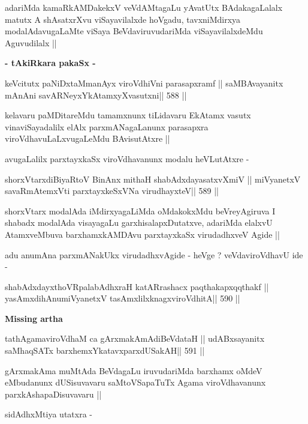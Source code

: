 \begin{artha}
adariMda kamaRkAMDakekxV veVdAMtagaLu yAvatUtx BAdakagaLalalx matutx A
shAsatxrXvu viSayavilalxde hoVgadu, tavxniMdirxya modalAdavugaLaMte
viSaya BeVdaviruvudariMda viSayavilalxdeMdu Aguvudilalx ||
\end{artha}

\medskip
\centerline{\textbf{- tAkiRkara pakaSx -}}

\begin{shl}
keVcitutx paNiDxtaMmanAyx viroVdhiVni parasapxramf ||
saMBAvayanitx mAnAni savARNeyxYkAtamxyXvasutxni\hfill || 588 ||
\end{shl}

\begin{artha}
kelavaru paMDitareMdu tamamxnunx tiLidavaru EkAtamx vasutx
vinaviSayadalilx elAlx parxmANagaLanunx parasapxra
viroVdhavuLaLxvugaLeMdu BAvisutAtxre ||

avugaLalilx parxtayxkaSx viroVdhavanunx modalu heVLutAtxre -
\end{artha}

\begin{shl}
shorxVtarxdiBiyaRtoV BinAnx mithaH shabAdxdayasatxvXmiV ||
miVyanetxV savaRmAtemxVti parxtayxkeSxVNa virudhayxteV\hfill || 589 ||
\end{shl}

\begin{artha}
shorxVtarx modalAda iMdirxyagaLiMda oMdakokxMdu beVreyAgiruva I
shabadx modalAda visayagaLu garxhisalapxDutatxve, adariMda elalxvU
AtamxveMbuva barxhamxkAMDAvu parxtayxkaSx virudadhxveV Agide ||

adu anumAna parxmANakUkx virudadhxvAgide - heVge ? veVdaviroVdhavU ide -
\end{artha}

\begin{shl}
shabAdxdayxthoVRpalabAdhxraH katARrashacx paqthakapxqqthakf ||
yasAmxdihAnumiVyanetxV tasAmxlilxknagxviroVdhitA\hfill || 590 ||
\end{shl}

\medskip
{\Large{\rm{\textbf{Missing artha}}}}

\medskip

\begin{shl}
tathA\s\s gamaviroVdhaM ca gArxmakAmAdiBeVdataH ||
udABxsayanitx saMhaqSATx barxhemxYkatavxparxdUSakAH\hfill || 591 ||
\end{shl}

\begin{artha}
gArxmakAma muMtAda BeVdagaLu iruvudariMda barxhamx oMdeV eMbudanunx
dUSisuvavaru saMtoVSapaTuTx Agama viroVdhavanunx parxkAshapaDisuvavaru
||

sidAdhxMtiya utatxra -
\end{artha}

